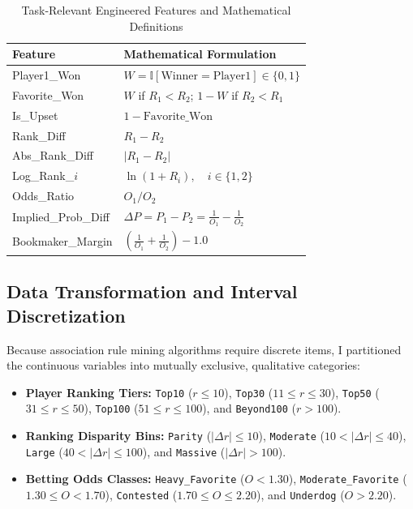\documentclass[10pt,journal]{IEEEtran}
\begin{document}
\begin{table}[!t]
\renewcommand{\arraystretch}{1.10}
\caption{Task-Relevant Engineered Features and Mathematical Definitions}
\label{tab:features}
\centering
\footnotesize
\begin{tabularx}{\columnwidth}{@{}>{\ttfamily}l Y@{}}
\toprule
\textrm{\textbf{Feature}} & \textbf{Mathematical Formulation} \\
\midrule
Player1\_Won & $W = \mathbb{I}[\text{Winner} = \text{Player1}] \in \{0, 1\}$ \\
Favorite\_Won & $W$ if $R_1 < R_2$; \quad $1 - W$ if $R_2 < R_1$ \\
Is\_Upset & $1 - \text{Favorite\_Won}$ \\
Rank\_Diff & $R_1 - R_2$ \\
Abs\_Rank\_Diff & $|R_1 - R_2|$ \\
Log\_Rank\_$i$ & $\ln(1 + R_i), \quad i \in \{1, 2\}$ \\
Odds\_Ratio & $O_1 / O_2$ \\
Implied\_Prob\_Diff & $\Delta P = P_1 - P_2 = \frac{1}{O_1} - \frac{1}{O_2}$ \\
Bookmaker\_Margin & $\left(\frac{1}{O_1} + \frac{1}{O_2}\right) - 1.0$ \\
\bottomrule
\end{tabularx}
\end{table}

\subsection{Data Transformation and Interval Discretization}
Because association rule mining algorithms require discrete items, I partitioned the continuous variables into mutually exclusive, qualitative categories:
\begin{itemize}
    \item \textbf{Player Ranking Tiers:} \texttt{Top10} ($r \le 10$), \texttt{Top30} ($11 \le r \le 30$), \texttt{Top50} ($31 \le r \le 50$), \texttt{Top100} ($51 \le r \le 100$), and \texttt{Beyond100} ($r > 100$).
    \item \textbf{Ranking Disparity Bins:} \texttt{Parity} ($|\Delta r| \le 10$), \texttt{Moderate} ($10 < |\Delta r| \le 40$), \texttt{Large} ($40 < |\Delta r| \le 100$), and \texttt{Massive} ($|\Delta r| > 100$).
    \item \textbf{Betting Odds Classes:} \texttt{Heavy\_Favorite} ($O < 1.30$), \texttt{Moderate\_Favorite} ($1.30 \le O < 1.70$), \texttt{Contested} ($1.70 \le O \le 2.20$), and \texttt{Underdog} ($O > 2.20$).
\end{itemize}
\end{document}
